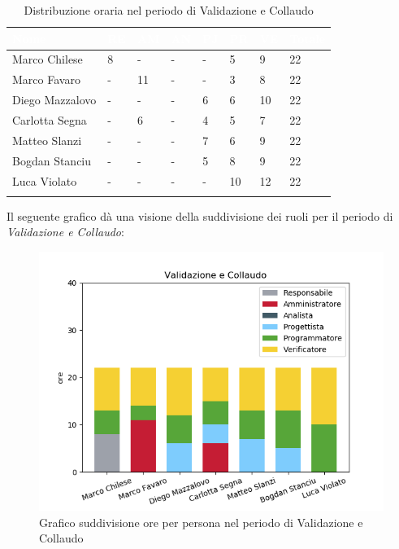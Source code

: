 \begin{longtable}{|C{.30\textwidth}|C{.06\textwidth}|C{.06\textwidth}|C{.06\textwidth} | C{.06\textwidth}| C{.06\textwidth} | C{.06\textwidth} | C{.10\textwidth} |}
	\hline
{}	\textbf{\textcolor{white}{Nome}} & \textbf{\textcolor{white}{RE}} & \textbf{\textcolor{white}{AM}} & \textbf{\textcolor{white}{AN}} & \textbf{\textcolor{white}{PJ}} & \textbf{\textcolor{white}{PR}} & \textbf{\textcolor{white}{VE}} & \textbf{\textcolor{white}{Totale}}\\
	\hline 
	Marco Chilese & 8 & - & - & - & 5 & 9 & 22 \\
	\hline
	Marco Favaro &  - & 11 & - & - & 3 & 8 & 22 \\
	\hline
	Diego Mazzalovo & - & - & - & 6 & 6 & 10 & 22 \\
	\hline
	Carlotta Segna & - & 6 & - & 4 & 5 & 7 & 22 \\
	\hline
	Matteo Slanzi & - & - & - & 7 & 6 & 9 & 22 \\
	\hline
	Bogdan Stanciu & - & - & - & 5 & 8 & 9 & 22 \\
	\hline
	Luca Violato & - & - & - & - & 10 & 12 & 22 \\   
	\hline
	
	
	\caption{Distribuzione oraria nel periodo di Validazione e Collaudo}
	\label{Distribuzione oraria vc}
\end{longtable}

Il seguente grafico dà una visione della suddivisione dei ruoli per il periodo di \textit{Validazione e Collaudo}:

\begin{figure}[H]
	\centering
	\includegraphics[width=1\linewidth]{./images/fig_vc.png}
	\caption{Grafico suddivisione ore per persona nel periodo di Validazione e Collaudo}
	\label{fig:grafico suddivione ruoli periodo vc}
\end{figure}


